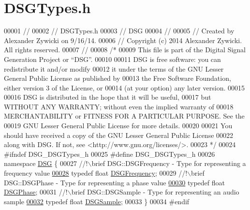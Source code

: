 \hypertarget{_d_s_g_types_8h_source}{\section{D\+S\+G\+Types.\+h}
\label{_d_s_g_types_8h_source}
}

\begin{DoxyCode}
00001 \textcolor{comment}{//}
00002 \textcolor{comment}{//  DSGTypes.h}
00003 \textcolor{comment}{//  DSG}
00004 \textcolor{comment}{//}
00005 \textcolor{comment}{//  Created by Alexander Zywicki on 9/16/14.}
00006 \textcolor{comment}{//  Copyright (c) 2014 Alexander Zywicki. All rights reserved.}
00007 \textcolor{comment}{//}
00008 \textcolor{comment}{/*}
00009 \textcolor{comment}{ This file is part of the Digital Signal Generation Project or “DSG”.}
00010 \textcolor{comment}{}
00011 \textcolor{comment}{ DSG is free software: you can redistribute it and/or modify}
00012 \textcolor{comment}{ it under the terms of the GNU Lesser General Public License as published by}
00013 \textcolor{comment}{ the Free Software Foundation, either version 3 of the License, or}
00014 \textcolor{comment}{ (at your option) any later version.}
00015 \textcolor{comment}{}
00016 \textcolor{comment}{ DSG is distributed in the hope that it will be useful,}
00017 \textcolor{comment}{ but WITHOUT ANY WARRANTY; without even the implied warranty of}
00018 \textcolor{comment}{ MERCHANTABILITY or FITNESS FOR A PARTICULAR PURPOSE.  See the}
00019 \textcolor{comment}{ GNU Lesser General Public License for more details.}
00020 \textcolor{comment}{}
00021 \textcolor{comment}{ You should have received a copy of the GNU Lesser General Public License}
00022 \textcolor{comment}{ along with DSG.  If not, see <http://www.gnu.org/licenses/>.}
00023 \textcolor{comment}{ */}
00024 \textcolor{preprocessor}{#ifndef DSG\_DSGTypes\_h}
00025 \textcolor{preprocessor}{#define DSG\_DSGTypes\_h}
00026 \textcolor{keyword}{namespace }\hyperlink{namespace_d_s_g}{DSG} \{\textcolor{comment}{}
00027 \textcolor{comment}{    //!\(\backslash\)brief DSG::DSGFrequency - Type for representing a frequency value}
\hypertarget{_d_s_g_types_8h_source_l00028}{}\hyperlink{namespace_d_s_g_a4315a061386fa1014fda09b15d3a6973}{00028} \textcolor{comment}{}    \textcolor{keyword}{typedef} \textcolor{keywordtype}{float} \hyperlink{namespace_d_s_g_a4315a061386fa1014fda09b15d3a6973}{DSGFrequency};\textcolor{comment}{}
00029 \textcolor{comment}{    //!\(\backslash\)brief DSG::DSGPhase - Type for representing a phase value}
\hypertarget{_d_s_g_types_8h_source_l00030}{}\hyperlink{namespace_d_s_g_a44431ce1eb0a7300efdd207bc879e52c}{00030} \textcolor{comment}{}    \textcolor{keyword}{typedef} \textcolor{keywordtype}{float} \hyperlink{namespace_d_s_g_a44431ce1eb0a7300efdd207bc879e52c}{DSGPhase};\textcolor{comment}{}
00031 \textcolor{comment}{    //!\(\backslash\)brief DSG::DSGSample - Type for representing an audio sample}
\hypertarget{_d_s_g_types_8h_source_l00032}{}\hyperlink{namespace_d_s_g_ac39a94cd27ebcd9c1e7502d0c624894a}{00032} \textcolor{comment}{}    \textcolor{keyword}{typedef} \textcolor{keywordtype}{float} \hyperlink{namespace_d_s_g_ac39a94cd27ebcd9c1e7502d0c624894a}{DSGSample};
00033 \}
00034 \textcolor{preprocessor}{#endif}
\end{DoxyCode}
